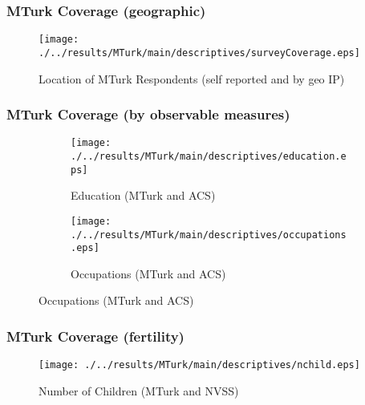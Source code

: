 \documentclass[10pt,letterpaper,subeqn]{beamer}
\newcommand{\backupend}{
  \setcounter{framenumber}{\value{finalframe}}
}
\begin{document}
\begin{frame}[label=MTurkCover]
\frametitle{MTurk Coverage (geographic)}
\begin{figure}[htpb!]
\begin{center}
  \centering
  \caption{Location of MTurk Respondents (self reported and by geo IP)}
  \texttt{[image: ./../results/MTurk/main/descriptives/surveyCoverage.eps]}
\end{center}
\end{figure}
\vspace{-5mm}
\hyperlink{MTurk}{}
\end{frame}

\begin{frame}[label=MTurkCover2]
\frametitle{MTurk Coverage (by observable measures)}
\begin{figure}[htpb!]
\begin{center}
\label{fig:tempUSA}
\begin{subfigure}{.5\textwidth}
  \centering
  \texttt{[image: ./../results/MTurk/main/descriptives/education.eps]}
  \caption{Education (MTurk and ACS)}
  \label{fig:tempUSAYoung}
\end{subfigure}%
\begin{subfigure}{.5\textwidth}
  \centering
  \texttt{[image: ./../results/MTurk/main/descriptives/occupations.eps]}
  \caption{Occupations (MTurk and ACS)}
  \label{fig:tempUSAOld}
\end{subfigure}
\end{center}
\end{figure}
\vspace{8mm}
\hyperlink{MTurk}{}
\end{frame}

\begin{frame}[label=MTurkCover3]
\frametitle{MTurk Coverage (fertility)}
\begin{figure}[htpb!]
\begin{center}
  \centering
  \caption{Number of Children (MTurk and NVSS)}
  \texttt{[image: ./../results/MTurk/main/descriptives/nchild.eps]}
\end{center}
\end{figure}
\vspace{-5mm}
\hyperlink{MTurk}{}
\end{frame}

\backupend
\end{document}
